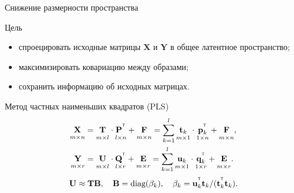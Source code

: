\documentclass[9pt]{beamer}
\newcommand{\bp}{\mathbf{p}}
\newcommand{\bq}{\mathbf{q}}
\newcommand{\bt}{\mathbf{t}}
\newcommand{\bu}{\mathbf{u}}
\newcommand{\bB}{\mathbf{B}}
\newcommand{\bE}{\mathbf{E}}
\newcommand{\bF}{\mathbf{F}}
\newcommand{\bP}{\mathbf{P}}
\newcommand{\bQ}{\mathbf{Q}}
\newcommand{\bT}{\mathbf{T}}
\newcommand{\bU}{\mathbf{U}}
\newcommand{\bX}{\mathbf{X}}
\newcommand{\bY}{\mathbf{Y}}
\newcommand{\T}{^{\text{\tiny\sffamily\upshape\mdseries T}}}
\begin{document}
\begin{frame}{Снижение размерности пространства}
\begin{block}{Цель}
	\begin{itemize}
		\item спроецировать исходные матрицы $\bX$ и $\bY$ в общее латентное пространство;
		\item максимизировать ковариацию между образами;
		\item сохранить информацию об исходных матрицах.
	\end{itemize}
\end{block}
\begin{block}{Метод частных наименьших квадратов (PLS)}
	\vspace{-0.5cm}
	\begin{align*}
		\underset{m \times n}{\vphantom{\bQ}\bX} 
		&= \underset{m \times l}{\vphantom{\bQ}\bT} \cdot \underset{l \times n}{\vphantom{\bQ}\bP^{\T}} + \underset{m \times n}{\vphantom{\bQ}\bF} 
		= \sum_{k=1}^l \underset{m \times 1}{\vphantom{\bp_k^{\T}}\bt_k} \cdot \underset{1 \times n}{\bp_k^{\T}} + \underset{m \times n}{\vphantom{\bp_k^{\T}}\bF},\\
		\underset{m \times r}{\vphantom{\bQ}\bY} 
		&= \underset{m \times l}{\vphantom{\bQ}\bU} \cdot \underset{l \times r}{\bQ^{\T}} + \underset{m \times r}{\vphantom{\bQ}\bE}
		=  \sum_{k=1}^l  \underset{m \times 1}{\vphantom{\bq_k^{\T}}\bu_k} \cdot \underset{1 \times r}{\bq_k^{\T}} +  \underset{m \times r}{\vphantom{\bq_k^{\T}}\bE}.
	\end{align*}
	\begin{equation*}
		\bU \approx \bT \bB, \quad \bB = \text{diag}(\beta_k), \quad \beta_k = \bu_k^{\T}\bt_k / (\bt_k^{\T}\bt_k).
	\end{equation*}
\end{block}

\end{frame}
\end{document}
